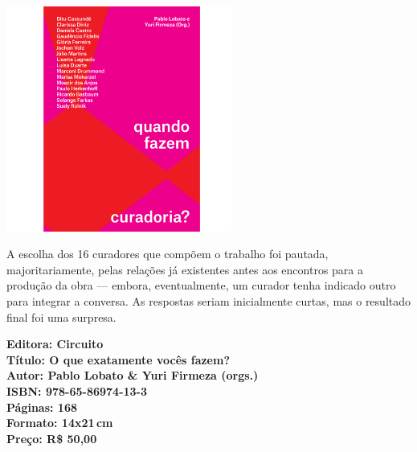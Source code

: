 \begin{center}
\hspace*{.5cm}\includegraphics[width=74mm]{./CAPAS/CIRCUITO_CURADORIA.jpg}
\end{center}
\hspace*{-7cm}\hrulefill\hspace*{-7cm}
\medskip

\noindent{}A escolha dos 16 curadores que compõem o trabalho foi pautada, majoritariamente, pelas relações já existentes antes aos encontros para a produção da obra --- embora, eventualmente, um curador tenha indicado outro para integrar a conversa.  As respostas seriam inicialmente curtas, mas o resultado final foi uma surpresa.

\vfill
\noindent\begin{minipage}[c]{1\linewidth}
{\small\textbf{
\hspace*{-.1cm}Editora: Circuito\\
Título: O que exatamente vocês fazem?\\
Autor: Pablo Lobato \& Yuri Firmeza (orgs.)\\ 
ISBN: 978-65-86974-13-3\\
Páginas: 168\\
Formato: 14x21\,cm\\
Preço: R\$ 50,00\\
}}
\end{minipage}
\pagebreak

\vspace*{1.5cm}
\bigskip

